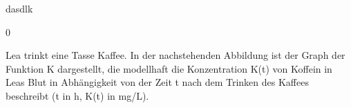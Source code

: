 \documentclass[a4paper,12pt]{article}
\begin{document}
\begin{beispiel}[1/2]{1} %
dasdlk
\end{beispiel}


\begin{langesbeispiel} \item[0] %

\begin{aufgabenstellung}
\item  Lea trinkt eine Tasse Kaffee. In der nachstehenden Abbildung ist der Graph der Funktion K dargestellt, die modellhaft die Konzentration K(t) von Koffein in Leas Blut in Abhängigkeit von
der Zeit t nach dem Trinken des Kaffees beschreibt (t in h, K(t) in mg/L).

 


\end{aufgabenstellung}



\end{langesbeispiel}
\end{document}
